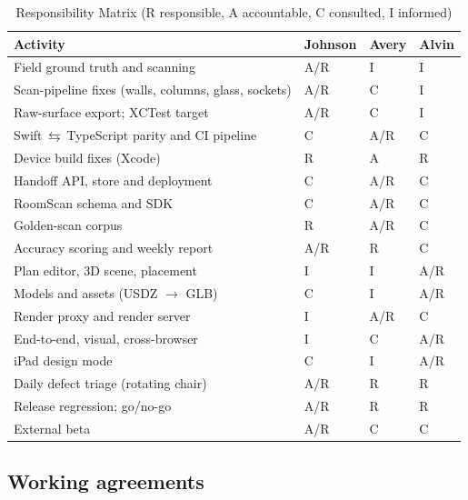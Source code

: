 \documentclass[conference,a4paper,10pt]{IEEEtran}
\newcommand{\swts}{Swift\,$\leftrightarrows$\,TypeScript}
\begin{document}
\begin{table}[!t]
\caption{Responsibility Matrix (R responsible, A accountable, C consulted, I informed)}
\label{tab:raci}
\centering
\footnotesize
\begin{tabularx}{\columnwidth}{@{}YC{0.95cm}C{0.95cm}C{0.95cm}@{}}
\toprule
Activity & Johnson & Avery & Alvin \\
\midrule
Field ground truth and scanning & A/R & I & I \\
Scan-pipeline fixes (walls, columns, glass, sockets) & A/R & C & I \\
Raw-surface export; XCTest target & A/R & C & I \\
\swts{} parity and CI pipeline & C & A/R & C \\
Device build fixes (Xcode) & R & A & R \\
Handoff API, store and deployment & C & A/R & C \\
RoomScan schema and SDK & C & A/R & C \\
Golden-scan corpus & R & A/R & C \\
Accuracy scoring and weekly report & A/R & R & C \\
Plan editor, 3D scene, placement & I & I & A/R \\
Models and assets (USDZ $\rightarrow$ GLB) & C & I & A/R \\
Render proxy and render server & I & A/R & C \\
End-to-end, visual, cross-browser & I & C & A/R \\
iPad design mode & C & I & A/R \\
Daily defect triage (rotating chair) & A/R & R & R \\
Release regression; go/no-go & A/R & R & R \\
External beta & A/R & C & C \\
\bottomrule
\end{tabularx}
\end{table}

\subsection{Working agreements}
\end{document}
